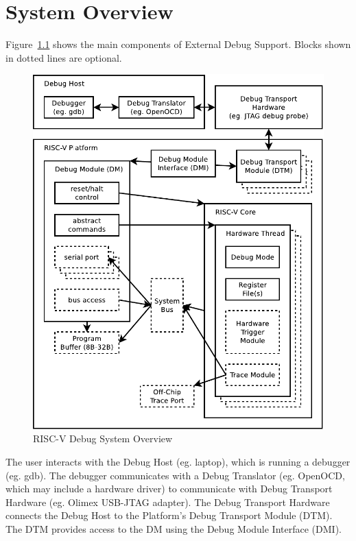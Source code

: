 \chapter{System Overview} \label{overview}

Figure~\ref{fig:overview} shows the main components of External Debug Support.
Blocks shown in dotted lines are optional. 

\begin{figure}
   \centering
   \includegraphics[width=\textwidth]{fig/overview-eps-converted-to.pdf}
   \caption{RISC-V Debug System Overview}
   \label{fig:overview}
\end{figure}

The user interacts with the Debug Host (eg. laptop), which is running a
debugger (eg. gdb).  The debugger communicates with a Debug Translator (eg.
OpenOCD, which may include a hardware driver) to communicate with Debug
Transport Hardware (eg.  Olimex USB-JTAG adapter).
The Debug Transport Hardware connects the Debug Host to the Platform's Debug
Transport Module (DTM).  The DTM provides access to the DM using the Debug
Module Interface (DMI).

